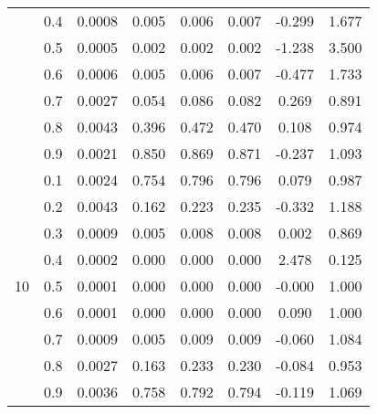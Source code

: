 \documentclass[11pt,a4paper]{report}
\begin{document}
\begin{longtable}{ | c | c || c | c | c | c | c | c | }
 & 0.4 & 0.0008 & 0.005 & 0.006 & 0.007 & -0.299 & 1.677 \\
 & 0.5 & 0.0005 & 0.002 & 0.002 & 0.002 & -1.238 & 3.500 \\
 & 0.6 & 0.0006 & 0.005 & 0.006 & 0.007 & -0.477 & 1.733 \\
 & 0.7 & 0.0027 & 0.054 & 0.086 & 0.082 & 0.269 & 0.891 \\
 & 0.8 & 0.0043 & 0.396 & 0.472 & 0.470 & 0.108 & 0.974 \\
 & 0.9 & 0.0021 & 0.850 & 0.869 & 0.871 & -0.237 & 1.093 \\
 \hline
\multirow{9}{*}{10} & 0.1 & 0.0024 & 0.754 & 0.796 & 0.796 & 0.079 & 0.987 \\
 & 0.2 & 0.0043 & 0.162 & 0.223 & 0.235 & -0.332 & 1.188 \\
 & 0.3 & 0.0009 & 0.005 & 0.008 & 0.008 & 0.002 & 0.869 \\
 & 0.4 & 0.0002 & 0.000 & 0.000 & 0.000 & 2.478 & 0.125 \\
 & 0.5 & 0.0001 & 0.000 & 0.000 & 0.000 & -0.000 & 1.000 \\
 & 0.6 & 0.0001 & 0.000 & 0.000 & 0.000 & 0.090 & 1.000 \\
 & 0.7 & 0.0009 & 0.005 & 0.009 & 0.009 & -0.060 & 1.084 \\
 & 0.8 & 0.0027 & 0.163 & 0.233 & 0.230 & -0.084 & 0.953 \\
 & 0.9 & 0.0036 & 0.758 & 0.792 & 0.794 & -0.119 & 1.069 \\
 \hline
\hline
\end{longtable}
\end{document}
